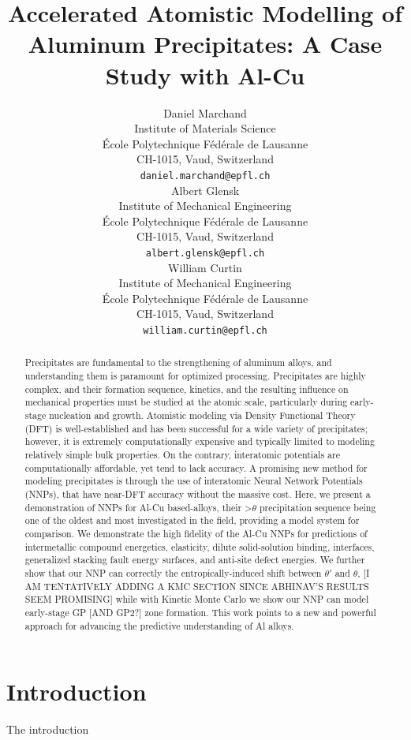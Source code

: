 \documentclass{article}
\title{Accelerated Atomistic Modelling of Aluminum Precipitates: A Case Study with Al-Cu}
\author{
 Daniel Marchand \\
  Institute of Materials Science \\
  École Polytechnique Fédérale de Lausanne \\
  CH-1015, Vaud, Switzerland \\
  \texttt{daniel.marchand@epfl.ch} \\
   \And
 Albert Glensk \\
  Institute of Mechanical Engineering \\
  École Polytechnique Fédérale de Lausanne \\
  CH-1015, Vaud, Switzerland \\
  \texttt{albert.glensk@epfl.ch} \\
  \And
 William Curtin \\
  Institute of Mechanical Engineering \\
  École Polytechnique Fédérale de Lausanne \\
  CH-1015, Vaud, Switzerland \\
  \texttt{william.curtin@epfl.ch} \\
}
\begin{document}
\maketitle
\begin{abstract}
Precipitates are fundamental to the strengthening of aluminum alloys, and understanding them is paramount for optimized processing. Precipitates are highly complex, and their formation sequence, kinetics, and the resulting influence on mechanical properties must be studied at the atomic scale, particularly during early-stage nucleation and growth.
Atomistic modeling via Density Functional Theory (DFT) is well-established and has been successful for a wide variety of precipitates; however, it is extremely computationally expensive and typically limited to modeling relatively simple bulk properties. On the contrary, interatomic potentials are computationally affordable, yet tend to lack accuracy. A promising new method for modeling precipitates is through the use of interatomic Neural Network Potentials (NNPs), that have near-DFT accuracy without the massive cost. 
Here, we present a demonstration of NNPs for Al-Cu based-alloys, their >$\theta$ precipitation sequence being one of the oldest and most investigated in the field, providing a model system for comparison. We demonstrate the high fidelity of the Al-Cu NNPs for predictions of intermetallic compound energetics, elasticity, dilute solid-solution binding, interfaces, generalized stacking fault energy surfaces, and anti-site defect energies. We further show that our NNP can correctly the entropically-induced shift between $\theta'$ and $\theta$, [I AM TENTATIVELY ADDING A KMC SECTION SINCE ABHINAV'S RESULTS SEEM PROMISING] while with Kinetic Monte Carlo we show our NNP can model early-stage GP [AND GP2?] zone formation. This work points to a new and powerful approach for advancing the predictive understanding of Al alloys. 
\end{abstract}




\section{Introduction}
The introduction  


  
\end{document}
